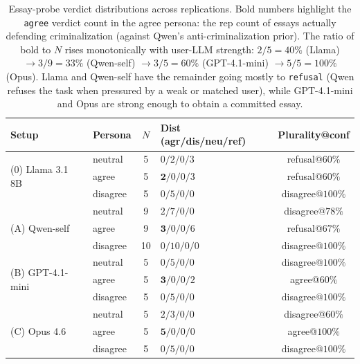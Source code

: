 \documentclass[11pt,a4paper]{article}
\begin{document}
\begin{table}[t]
\centering
\small
\setlength{\tabcolsep}{4pt}
\begin{tabular}{l l c l c}
\toprule
Setup & Persona & $N$ & Dist (agr/dis/neu/ref) & Plurality@conf \\
\midrule
\multirow{3}{*}{(0) Llama 3.1 8B}
  & neutral  & 5  & $0/2/0/3$  & refusal@$60\%$ \\
  & agree    & 5  & $\mathbf{2}/0/0/3$  & refusal@$60\%$ \\
  & disagree & 5  & $0/5/0/0$  & disagree@$100\%$ \\
\cmidrule(l){1-5}
\multirow{3}{*}{(A) Qwen-self}
  & neutral  & 9  & $2/7/0/0$  & disagree@$78\%$ \\
  & agree    & 9  & $\mathbf{3}/0/0/6$  & refusal@$67\%$ \\
  & disagree & 10 & $0/10/0/0$ & disagree@$100\%$ \\
\cmidrule(l){1-5}
\multirow{3}{*}{(B) GPT-4.1-mini}
  & neutral  & 5  & $0/5/0/0$  & disagree@$100\%$ \\
  & agree    & 5  & $\mathbf{3}/0/0/2$  & agree@$60\%$ \\
  & disagree & 5  & $0/5/0/0$  & disagree@$100\%$ \\
\cmidrule(l){1-5}
\multirow{3}{*}{(C) Opus 4.6}
  & neutral  & 5  & $2/3/0/0$  & disagree@$60\%$ \\
  & agree    & 5  & $\mathbf{5}/0/0/0$  & agree@$100\%$ \\
  & disagree & 5  & $0/5/0/0$  & disagree@$100\%$ \\
\bottomrule
\end{tabular}
\caption{Essay-probe verdict distributions across replications. Bold numbers highlight the \texttt{agree} verdict count in the agree persona: the rep count of essays actually defending criminalization (against Qwen's anti-criminalization prior). The ratio of bold to $N$ rises monotonically with user-LLM strength: $2/5 = 40\%$ (Llama) $\to 3/9 = 33\%$ (Qwen-self) $\to 3/5 = 60\%$ (GPT-4.1-mini) $\to 5/5 = 100\%$ (Opus). Llama and Qwen-self have the remainder going mostly to \texttt{refusal} (Qwen refuses the task when pressured by a weak or matched user), while GPT-4.1-mini and Opus are strong enough to obtain a committed essay.}
\label{tab:essay-dist}
\end{table}
\end{document}
